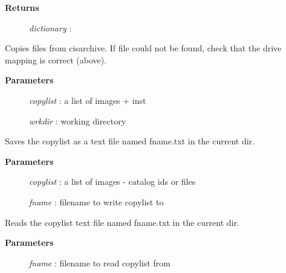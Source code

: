 \documentclass[letterpaper,10pt,english]{sphinxmanual}
\begin{document}
\begin{fulllineitems}
\begin{fulllineitems}
\begin{description}
\item[{\textbf{Returns}}] \leavevmode
\emph{dictionary}    :

\end{description}

\end{fulllineitems}


\begin{fulllineitems}
\label{code:Database.Database.copyfiles}
Copies files from cisarchive.  If file could not be found, check that the 
drive mapping is correct (above).
\begin{description}
\item[{\textbf{Parameters}}] \leavevmode
\emph{copylist}  :   a list of images + inst

\emph{wrkdir}    :   working directory

\end{description}

\end{fulllineitems}


\begin{fulllineitems}
\label{code:Database.Database.copylistExport}
Saves the copylist as a text file named fname.txt in the current dir.
\begin{description}
\item[{\textbf{Parameters}}] \leavevmode
\emph{copylist}   :  a list of images - catalog ids or files

\emph{fname}    :    filename to write copylist to

\end{description}

\end{fulllineitems}


\begin{fulllineitems}
\label{code:Database.Database.copylistImport}
Reads the copylist text file named fname.txt in the current dir.
\begin{description}
\item[{\textbf{Parameters}}] \leavevmode
\emph{fname} :   filename to read copylist from


\end{description}
\end{fulllineitems}
\end{fulllineitems}
\end{document}
